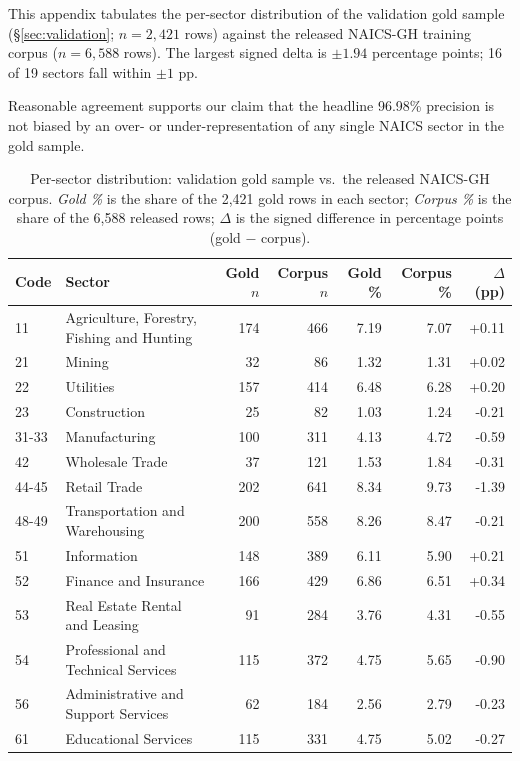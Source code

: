 This appendix tabulates the per-sector distribution of the validation gold sample (\S\ref{sec:validation}; $n = 2,421$ rows) against the released NAICS-GH training corpus ($n = 6,588$ rows). The largest signed delta is $\pm 1.94$ percentage points; 16 of 19 sectors fall within $\pm 1$ pp.

Reasonable agreement supports our claim that the headline 96.98\% precision is not biased by an over- or under-representation of any single NAICS sector in the gold sample.

\begin{table}[ht]
\centering
\caption{Per-sector distribution: validation gold sample vs.\ the released NAICS-GH corpus. \emph{Gold \%} is the share of the 2,421 gold rows in each sector; \emph{Corpus \%} is the share of the 6,588 released rows; \emph{$\Delta$} is the signed difference in percentage points (gold $-$ corpus).}
\label{tab:stratification}
\small
\begin{tabular}{llrrrrr}
\toprule
Code & Sector & Gold $n$ & Corpus $n$ & Gold \% & Corpus \% & $\Delta$ (pp) \\
\midrule
11 & Agriculture, Forestry, Fishing and Hunting & 174 & 466 & 7.19 & 7.07 & +0.11 \\
21 & Mining & 32 & 86 & 1.32 & 1.31 & +0.02 \\
22 & Utilities & 157 & 414 & 6.48 & 6.28 & +0.20 \\
23 & Construction & 25 & 82 & 1.03 & 1.24 & -0.21 \\
31-33 & Manufacturing & 100 & 311 & 4.13 & 4.72 & -0.59 \\
42 & Wholesale Trade & 37 & 121 & 1.53 & 1.84 & -0.31 \\
44-45 & Retail Trade & 202 & 641 & 8.34 & 9.73 & -1.39 \\
48-49 & Transportation and Warehousing & 200 & 558 & 8.26 & 8.47 & -0.21 \\
51 & Information & 148 & 389 & 6.11 & 5.90 & +0.21 \\
52 & Finance and Insurance & 166 & 429 & 6.86 & 6.51 & +0.34 \\
53 & Real Estate Rental and Leasing & 91 & 284 & 3.76 & 4.31 & -0.55 \\
54 & Professional and Technical Services & 115 & 372 & 4.75 & 5.65 & -0.90 \\
56 & Administrative and Support Services & 62 & 184 & 2.56 & 2.79 & -0.23 \\
61 & Educational Services & 115 & 331 & 4.75 & 5.02 & -0.27 \\

\end{tabular}
\end{table}
